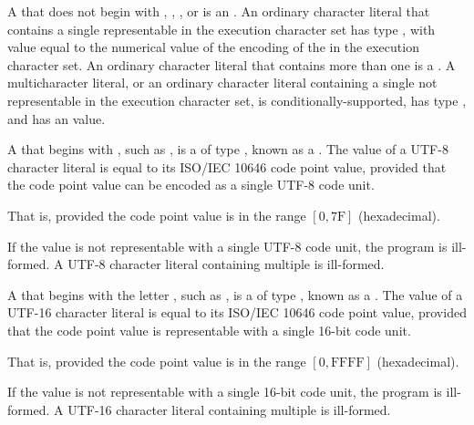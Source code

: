 \documentclass{wg21}
\begin{document}
\begin{removedblock}
%
%
%
%
%
A  that does not begin with
, , , or 
is an .
An ordinary character literal that contains a
single  representable in the execution character
set has type , with value equal to the
numerical value of the encoding of the  in the
execution character set. An ordinary character literal that contains
more than one  is a
%
.
A multicharacter literal, or an ordinary character literal containing
a single  not representable in the execution
character set, is conditionally-supported, has type ,
%
and has an  value.

\pnum
{}%
A  that
begins with , such as ,
%
is a  of type ,
known as a .
The value of a UTF-8 character literal
is equal to its ISO/IEC 10646 code point value,
provided that the code point value
can be encoded as a single UTF-8 code unit.
\begin{note}
    That is, provided the code point value is in the range $[0, \mathrm{7F}]$ (hexadecimal).
\end{note}
If the value is not representable with a single UTF-8 code unit,
the program is ill-formed.
A UTF-8 character literal containing multiple  is ill-formed.

\pnum
{}%
%
A  that
begins with the letter , such as ,
%
is a  of type ,
known as a .
The value of a UTF-16 character literal
is equal to its ISO/IEC 10646 code point value,
provided that the code point value is
representable with a single 16-bit code unit.
\begin{note}
    That is, provided the code point value is in the range $[0, \mathrm{FFFF}]$ (hexadecimal).
\end{note}
If the value is not representable
with a single 16-bit code unit, the program is ill-formed.
A UTF-16 character literal
containing multiple  is ill-formed.


\end{removedblock}
\end{document}
